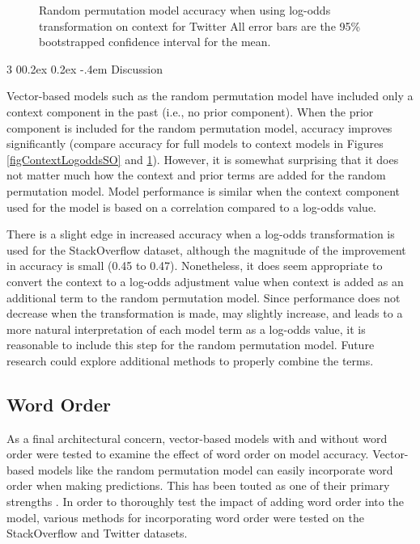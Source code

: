 \documentclass[man,floatsintext,donotrepeattitle]{apa6}
\makeatletter
\renewcommand{\subsubsection}{%
  \@startsection
  {subsubsection}%
  {3}%
  {\parindent}%
  {0\baselineskip \@plus 0.2ex \@minus 0.2ex}%
  {-.4em}%
  {\normalfont\normalsize\bfseries\addperi}}
\newcommand{\numNoZero}[1]{{\sisetup{add-integer-zero=false}\num{#1}}}
\makeatother
\begin{document}
\begin{figure}[!htbp]
  \caption{
  Random permutation model accuracy when using log-odds transformation on context for Twitter
  All error bars are the 95\% bootstrapped confidence interval for the mean. 
}
  \label{figContextLogoddsT}
\end{figure}

\subsubsection{Discussion}

Vector-based models such as the random permutation model \parencite{Sahlgren2008} have included only a context component in the past (i.e., no prior component).
When the prior component is included for the random permutation model, accuracy improves significantly (compare accuracy for full models to context models in Figures \ref{figContextLogoddsSO} and \ref{figContextLogoddsT}).
However, it is somewhat surprising that it does not matter much how the context and prior terms are added for the random permutation model.
Model performance is similar when the context component used for the model is based on a correlation compared to a log-odds value.

There is a slight edge in increased accuracy when a log-odds transformation is used for the StackOverflow dataset, although the magnitude of the improvement in accuracy is small (\numNoZero{.45} to \numNoZero{.47}).
Nonetheless, it does seem appropriate to convert the context to a log-odds adjustment value when context is added as an additional term to the random permutation model.
Since performance does not decrease when the transformation is made, may slightly increase,
and leads to a more natural interpretation of each model term as a log-odds value, it is reasonable to include this step for the random permutation model.
Future research could explore additional methods to properly combine the terms.

\subsection{Word Order}

As a final architectural concern, vector-based models with and without word order were tested to examine the effect of word order on model accuracy.
Vector-based models like the random permutation model can easily incorporate word order when making predictions.
This has been touted as one of their primary strengths \parencites{Jones2007, Sahlgren2008}.
In order to thoroughly test the impact of adding word order into the model, various methods for incorporating word order were tested on the StackOverflow and Twitter datasets.
\end{document}
